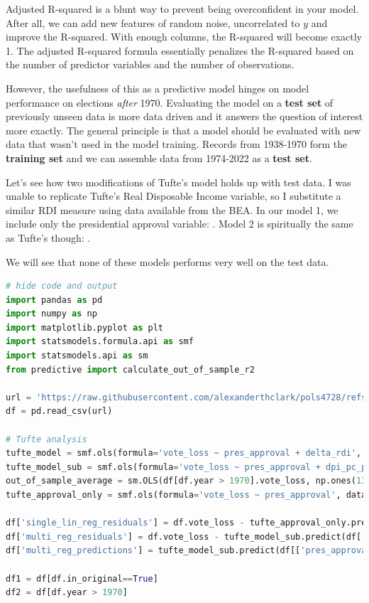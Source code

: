 Adjusted R-squared is a blunt way to prevent being overconfident in your model. After all, we can add new features of random noise, uncorrelated to $y$ and improve the R-squared. With enough columns, the R-squared will become exactly 1. The adjusted R-squared formula essentially penalizes the R-squared based on the number of predictor variables and the number of observations.

However, the usefulness of this as a predictive model hinges on model performance on elections \textit{after} 1970. Evaluating the model on a \textbf{test set} of previously unseen data is more data driven and it answers the question of interest more exactly. The general principle is that a model should be evaluated with new data that wasn't used in the model training. Records from 1938-1970 form the \textbf{training set} and we can assemble data from 1974-2022 as a \textbf{test set}.

Let's see how two modifications of Tufte's model holds up with test data. I was unable to replicate Tufte's Real Disposable Income variable, so I substitute a similar RDI measure using data available from the BEA. In our model 1, we include only the presidential approval variable: . Model 2 is spiritually the same as Tufte's though: .

We will see that none of these models performs very well on the test data.

\begin{lstlisting}[language=Python]
# hide code and output
import pandas as pd
import numpy as np
import matplotlib.pyplot as plt
import statsmodels.formula.api as smf
import statsmodels.api as sm
from predictive import calculate_out_of_sample_r2

url = 'https://raw.githubusercontent.com/alexanderthclark/pols4728/refs/heads/main/data/tufte_midterms.csv'
df = pd.read_csv(url)

# Tufte analysis
tufte_model = smf.ols(formula='vote_loss ~ pres_approval + delta_rdi', data=df[df.in_original==True]).fit()
tufte_model_sub = smf.ols(formula='vote_loss ~ pres_approval + dpi_pc_pct_yoy', data=df[df.in_original==True]).fit()
out_of_sample_average = sm.OLS(df[df.year > 1970].vote_loss, np.ones(13)).fit()
tufte_approval_only = smf.ols(formula='vote_loss ~ pres_approval', data=df[df.in_original==True]).fit()

df['single_lin_reg_residuals'] = df.vote_loss - tufte_approval_only.predict(df.pres_approval)
df['multi_reg_residuals'] = df.vote_loss - tufte_model_sub.predict(df[['pres_approval', 'dpi_pc_pct_yoy']])
df['multi_reg_predictions'] = tufte_model_sub.predict(df[['pres_approval', 'dpi_pc_pct_yoy']])

df1 = df[df.in_original==True]
df2 = df[df.year > 1970]
\end{lstlisting}

